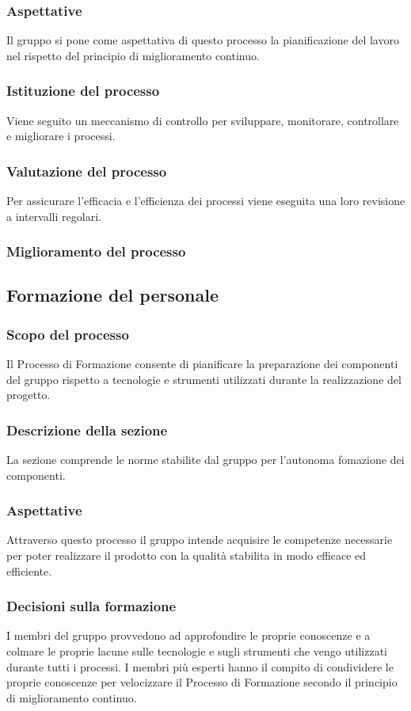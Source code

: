 \subsubsection{Aspettative}
Il gruppo si pone come aspettativa di questo processo la pianificazione del lavoro nel rispetto del principio di miglioramento continuo.
\subsubsection{Istituzione del processo}
Viene seguito un meccanismo di controllo per sviluppare, monitorare, controllare e migliorare i processi.
\subsubsection{Valutazione del processo}
Per assicurare l'efficacia e l'efficienza dei processi viene eseguita una loro revisione a intervalli regolari.
\subsubsection{Miglioramento del processo}

\subsection{Formazione del personale}
\subsubsection{Scopo del processo}
Il Processo di Formazione consente di pianificare la preparazione dei componenti del gruppo rispetto a tecnologie e strumenti utilizzati durante la realizzazione del progetto.
\subsubsection{Descrizione della sezione}
La sezione comprende le norme stabilite dal gruppo per l'autonoma fomazione dei componenti.
\subsubsection{Aspettative}
Attraverso questo processo il gruppo intende acquisire le competenze necessarie per poter realizzare il prodotto con la qualità stabilita in modo efficace ed efficiente.
\subsubsection{Decisioni sulla formazione}
I membri del gruppo provvedono ad approfondire le proprie conoscenze e a colmare le proprie lacune sulle tecnologie e sugli strumenti che vengo utilizzati durante tutti i processi. I membri più esperti hanno il compito di condividere le proprie conoscenze per velocizzare il Processo di Formazione secondo il principio di miglioramento continuo. 